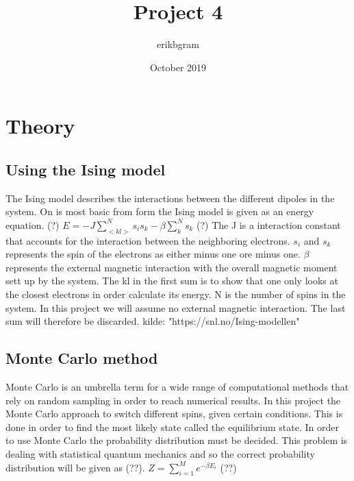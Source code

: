 \documentclass{article}
\title{Project 4}
\author{erikbgram }
\date{October 2019}
\begin{document}
\maketitle

\section{Theory}


\subsection{Using the Ising model}

The Ising model describes the interactions between the different dipoles in the system. On is most basic from  form the Ising model is given as an energy equation. (?)
\newline
\newline
$E = -J \sum_{<kl>}^{N} s_i s_k - \beta \sum_{k}^{N}s_k$ (?)
\newline
\newline
The J is a interaction constant that accounts for the interaction between the neighboring electrons. $s_i$ and $s_k$ represents the spin of the electrons as either minus one ore minus one. $\beta$ represents the external magnetic interaction with the overall magnetic moment sett up by the system. The kl in the first sum is to show that one only looks at the closest electrons in order calculate its energy. N is the number of spins in the system. In this project we will assume no external magnetic interaction. The last sum will therefore be discarded.
\newline
\newline
kilde: "https://snl.no/Ising-modellen"
\newline
\newline
\subsection{Monte Carlo method}
\newline
\newline
Monte Carlo is an umbrella term for a wide range of computational methods that rely on random sampling in order to reach numerical results.
\newline
\newline
In this project the Monte Carlo approach to switch different spins, given certain conditions. This is done in order to find the most likely state called the equilibrium state. In order to use Monte Carlo the probability distribution must be decided. This problem is dealing with statistical quantum mechanics and so the correct probability distribution will be given as (??).
\newline
\newline
$Z = \sum_{i=1}^{M} e^{-\beta E_i}  $ (??)
\newline
\newline
\end{document}
